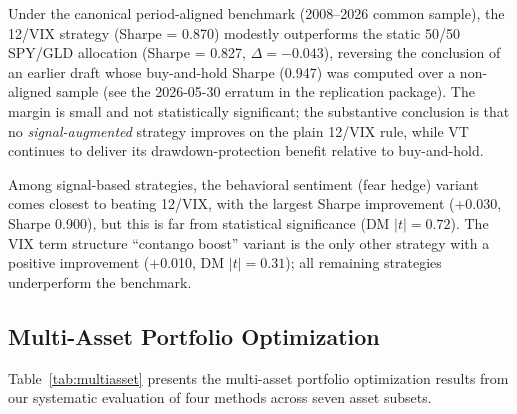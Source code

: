 \documentclass[12pt,a4paper]{article}
\begin{document}
Under the canonical period-aligned benchmark (2008--2026 common sample), the 12/VIX strategy (Sharpe = 0.870) modestly outperforms the static 50/50 SPY/GLD allocation (Sharpe = 0.827, $\Delta = -0.043$), reversing the conclusion of an earlier draft whose buy-and-hold Sharpe (0.947) was computed over a non-aligned sample (see the 2026-05-30 erratum in the replication package). The margin is small and not statistically significant; the substantive conclusion is that no \emph{signal-augmented} strategy improves on the plain 12/VIX rule, while VT continues to deliver its drawdown-protection benefit relative to buy-and-hold.

Among signal-based strategies, the behavioral sentiment (fear hedge) variant comes closest to beating 12/VIX, with the largest Sharpe improvement (+0.030, Sharpe 0.900), but this is far from statistical significance (DM $|t| = 0.72$). The VIX term structure ``contango boost'' variant is the only other strategy with a positive improvement (+0.010, DM $|t| = 0.31$); all remaining strategies underperform the benchmark.

\subsection{Multi-Asset Portfolio Optimization}

Table~\ref{tab:multiasset} presents the multi-asset portfolio optimization results from our systematic evaluation of four methods across seven asset subsets.
\end{document}
